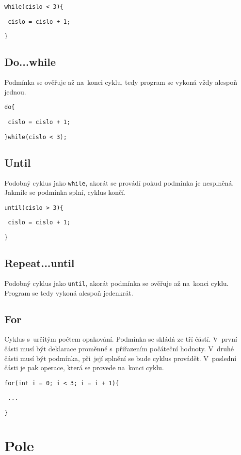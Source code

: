 \documentclass[czech]{thesiskiv}
\begin{document}

\texttt{while(cislo < 3)\{}

\texttt{    cislo = cislo + 1;}

\texttt{\}}

\subsection{Do...while}
Podmínka se ověřuje až na~konci cyklu, tedy program se vykoná vždy alespoň jednou.


\texttt{do\{}

\texttt{    cislo = cislo + 1;}

\texttt{\}while(cislo < 3);}

\subsection{Until}
Podobný cyklus jako \texttt{while}, akorát se provádí pokud podmínka je nesplněná.
Jakmile se podmínka splní, cyklus končí.


\texttt{until(cislo > 3)\{}

\texttt{    cislo = cislo + 1;}

\texttt{\}}

\subsection{Repeat...until}
Podobný cyklus jako \texttt{until}, akorát podmínka se ověřuje až na~konci cyklu.
Program se tedy vykoná alespoň jedenkrát.

\subsection{For}
Cyklus s~určitým počtem opakování. Podmínka se skládá ze tří částí.
V~první části musí být deklarace proměnné s~přiřazením počáteční hodnoty.
V~druhé části musí být podmínka, při~její splnění se bude cyklus provádět.
V~poslední části je pak operace, která se provede na~konci cyklu.


\texttt{for(int i = 0; i < 3; i = i + 1)\{} 

\texttt{    ...}

\texttt{\}}
               
\section{Pole}
\end{document}
